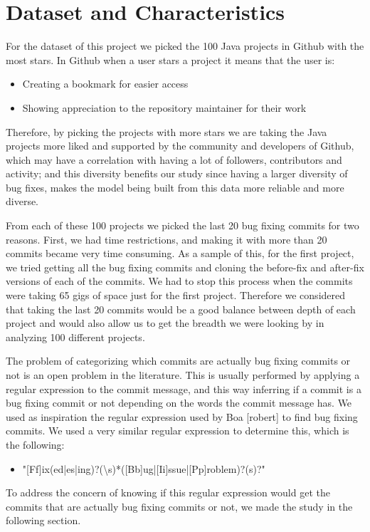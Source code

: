 
\section{Dataset and Characteristics}
For the dataset of this project we picked the 100 Java projects in Github with the most stars. In Github when a user stars a project it means that the user is:
\begin{itemize}
  \item Creating a bookmark for easier access
  \item Showing appreciation to the repository maintainer for their work
\end{itemize}

Therefore, by picking the projects with more stars we are taking the Java projects more liked and supported by the community and developers of Github, which may have a correlation with having a lot of followers, contributors and activity; and this diversity benefits our study since having a larger diversity of bug fixes, makes the model being built from this data more reliable and more diverse.

From each of these 100 projects we picked the last 20 bug fixing commits for two reasons. First, we had time restrictions, and making it with more than 20 commits became very time consuming. As a sample of this, for the first project, we tried getting all the bug fixing commits and cloning the before-fix and after-fix versions of each of the commits. We had to stop this process when the commits were taking 65 gigs of space just for the first project. Therefore we considered that taking the last 20 commits would be a good balance between depth of each project and would also allow us to get the breadth we were looking by in analyzing 100 different projects. 

The problem of categorizing which commits are actually bug fixing commits or not is an open problem in the literature. This is usually performed by applying a regular expression to the commit message, and this way inferring if a commit is a bug fixing commit or not depending on the words the commit message has. We used as inspiration the regular expression used by Boa [robert] to find bug fixing commits. We used a very similar regular expression to determine this, which is the following:
\begin{itemize}
  \item "[Ff]ix(ed|es|ing)?(\textbackslash s)*([Bb]ug|[Ii]ssue|[Pp]roblem)?(s)?"
\end{itemize}

To address the concern of knowing if this regular expression would get the commits that are actually bug fixing commits or not, we made the study in the following section.


